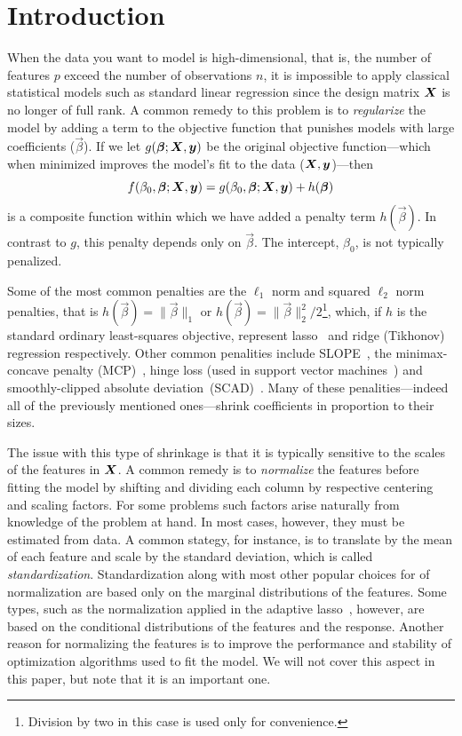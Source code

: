\section{Introduction}

When the data you want to model is high-dimensional, that is, the number of features \(p\)
exceed the number of observations \(n\), it is impossible to apply classical statistical
models such as standard linear regression since the design matrix \(\boldsymbol X\) is no longer
of full rank. A common remedy to this problem is to \emph{regularize} the model by adding a
term to the objective function that punishes models with large coefficients
(\(\vec\beta\)). If we let \(g(\boldsymbol\beta; \boldsymbol X, \boldsymbol y)\) be the original objective
function---which when minimized improves the model's fit to the data (\(\boldsymbol X, \boldsymbol
y\))---then
\begin{equation}
  \label{eq:general-objective}
  f(\beta_0, \boldsymbol\beta; \boldsymbol X, \boldsymbol y) = g(\beta_0, \boldsymbol\beta; \boldsymbol X, \boldsymbol y) + h(\boldsymbol\beta)
\end{equation}
is a composite function within which we have added a penalty term \(h(\vec\beta)\). In
contrast to \(g\), this penalty depends only on \(\vec{\beta}\). The intercept,
\(\beta_0\), is not typically penalized.

Some of the most common penalties are the \(\ell_1\) norm and squared \(\ell_2\) norm
penalties, that is \(h(\vec\beta) = \lVert \vec\beta \rVert_1\) or \(h(\vec\beta) = \lVert
\vec\beta \rVert_2^2/2\)\footnote{Division by two in this case is used only for
  convenience.}, which, if \(h\) is the standard ordinary least-squares objective, represent
lasso~\citep{tibshirani1996,santosa1986,donoho1994} and ridge (Tikhonov) regression
respectively. Other common penalities include SLOPE~\citep{bogdan2013,bogdan2015}, the
minimax-concave penalty (MCP)~\citep{zhang2010}, hinge loss (used in support vector
machines~\citep{cortes1995}) and smoothly-clipped absolute
deviation~(SCAD)~\citep{fan2001}. Many of these penalities---indeed all of the previously
mentioned ones---shrink coefficients in proportion to their sizes.

The issue with this type of shrinkage is that it is typically sensitive to the scales of
the features in \(\boldsymbol X\). A common remedy is to \emph{normalize} the features before
fitting the model by shifting and dividing each column by respective centering and scaling
factors. For some problems such factors arise naturally from knowledge of the problem at
hand. In most cases, however, they must be estimated from data. A common stategy, for
instance, is to translate by the mean of each feature and scale by the standard deviation,
which is called \emph{standardization}. Standardization along with most other popular
choices for of normalization are based only on the marginal distributions of the features.
Some types, such as the normalization applied in the adaptive lasso~\citep{zou2006},
however, are based on the conditional distributions of the features and the response.
Another reason for normalizing the features is to improve the performance and stability of
optimization algorithms used to fit the model. We will not cover this aspect in this paper,
but note that it is an important one.

